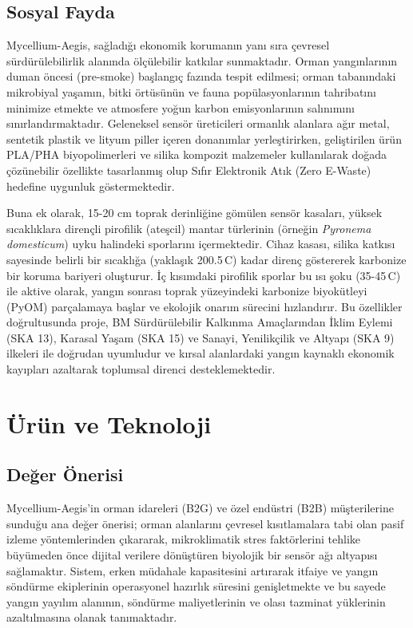 \documentclass[11pt,a4paper]{article}
\begin{document}
\subsection{Sosyal Fayda}

Mycellium-Aegis, sağladığı ekonomik korumanın yanı sıra çevresel sürdürülebilirlik alanında ölçülebilir katkılar sunmaktadır. Orman yangınlarının duman öncesi (pre-smoke) başlangıç fazında tespit edilmesi; orman tabanındaki mikrobiyal yaşamın, bitki örtüsünün ve fauna popülasyonlarının tahribatını minimize etmekte ve atmosfere yoğun karbon emisyonlarının salınımını sınırlandırmaktadır. Geleneksel sensör üreticileri ormanlık alanlara ağır metal, sentetik plastik ve lityum piller içeren donanımlar yerleştirirken, geliştirilen ürün PLA/PHA biyopolimerleri ve silika kompozit malzemeler kullanılarak doğada çözünebilir özellikte tasarlanmış olup Sıfır Elektronik Atık (Zero E-Waste) hedefine uygunluk göstermektedir.

Buna ek olarak, 15-20 cm toprak derinliğine gömülen sensör kasaları, yüksek sıcaklıklara dirençli pirofilik (ateşcil) mantar türlerinin (örneğin \textit{Pyronema domesticum}) uyku halindeki sporlarını içermektedir. Cihaz kasası, silika katkısı sayesinde belirli bir sıcaklığa (yaklaşık 200.5\,\textdegree C) kadar direnç göstererek karbonize bir koruma bariyeri oluşturur. İç kısımdaki pirofilik sporlar bu ısı şoku (35-45\,\textdegree C) ile aktive olarak, yangın sonrası toprak yüzeyindeki karbonize biyokütleyi (PyOM) parçalamaya başlar ve ekolojik onarım sürecini hızlandırır. Bu özellikler doğrultusunda proje, BM Sürdürülebilir Kalkınma Amaçlarından İklim Eylemi (SKA 13), Karasal Yaşam (SKA 15) ve Sanayi, Yenilikçilik ve Altyapı (SKA 9) ilkeleri ile doğrudan uyumludur ve kırsal alanlardaki yangın kaynaklı ekonomik kayıpları azaltarak toplumsal direnci desteklemektedir.

\section{Ürün ve Teknoloji}

\subsection{Değer Önerisi}

Mycellium-Aegis'in orman idareleri (B2G) ve özel endüstri (B2B) müşterilerine sunduğu ana değer önerisi; orman alanlarını çevresel kısıtlamalara tabi olan pasif izleme yöntemlerinden çıkararak, mikroklimatik stres faktörlerini tehlike büyümeden önce dijital verilere dönüştüren biyolojik bir sensör ağı altyapısı sağlamaktır. Sistem, erken müdahale kapasitesini artırarak itfaiye ve yangın söndürme ekiplerinin operasyonel hazırlık süresini genişletmekte ve bu sayede yangın yayılım alanının, söndürme maliyetlerinin ve olası tazminat yüklerinin azaltılmasına olanak tanımaktadır.
\end{document}
